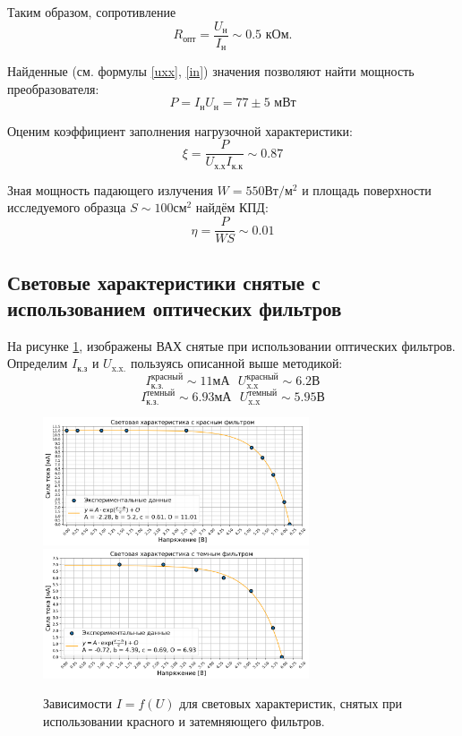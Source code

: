 \documentclass[a4paper, 12pt]{extarticle}
\begin{document}
Таким образом, сопротивление 
\begin{equation}
R_{\text{опт}} = \frac{U_{\text{н}}}{I_{\text{н}}} \sim 0.5 \text{ кОм}. 
\end{equation}


Найденные (см. формулы \ref{uxx}, \ref{in}) значения позволяют найти мощность преобразователя:
\begin{equation}
    P  = I_{\text{н}} U_{\text{н}} = 77 \pm 5 \text{ мВт}
\end{equation}

Оценим коэффициент заполнения нагрузочной характеристики:
\begin{equation}
    \xi = \frac{P}{U_{\text{х.х}} I_{\text{к.к}}} \sim 0.87
\end{equation}


Зная мощность падающего излучения $W = 550 \text{Вт}/\text{м}^{2}$ и площадь поверхности исследуемого образца $S \sim 100 \text{см}^2$ найдём КПД:
\begin{equation}
    \eta = \frac{P}{W S} \sim 0.01  
    \label{kpd}
\end{equation}



\subsection*{\textcolor{sub_header}{Световые характеристики снятые с использованием оптических фильтров}}



На рисунке \ref{fig:filters}, изображены ВАХ снятые при использовании оптических фильтров. Определим $I_{\text{к.з}}$ и $U_{\text{x.x.}}$ пользуясь описанной выше методикой:
$$
I_{\text{к.з.}}^{\text{красный}} \sim 11 \text{мА} \text{   } U_{\text{x.x}}^{\text{красный}} \sim 6.2 \text{В}
$$
$$
I_{\text{к.з.}}^{\text{темный}} \sim 6.93 \text{мА} \text{   } U_{\text{x.x}}^{\text{темный}} \sim 5.95 \text{В}
$$
\begin{figure}[htbp]
    \centering
    \includegraphics[width = 0.7\textwidth]{pics/red_filter.png} \hfill
    \includegraphics[width = 0.7\textwidth]{pics/black_filter.png}
    \caption{Зависимости $I = f(U)$ для световых характеристик, снятых при использовании красного и затемняющего фильтров.}
    \label{fig:filters}
\end{figure}
\end{document}
